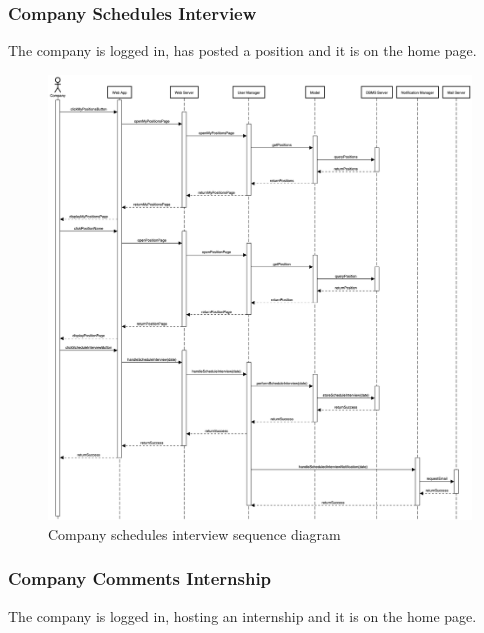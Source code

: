 \newpage
\subsubsection{Company Schedules Interview}
The company is logged in, has posted a position and it is on the home page.

\begin{figure}[h]
    \centering
    \includegraphics[width=16cm]{images/sequence-diagrams/company-schedules-interview.png}
    \caption{Company schedules interview sequence diagram}
\end{figure}

\newpage
\subsubsection{Company Comments Internship}
The company is logged in, hosting an internship and it is on the home page.

